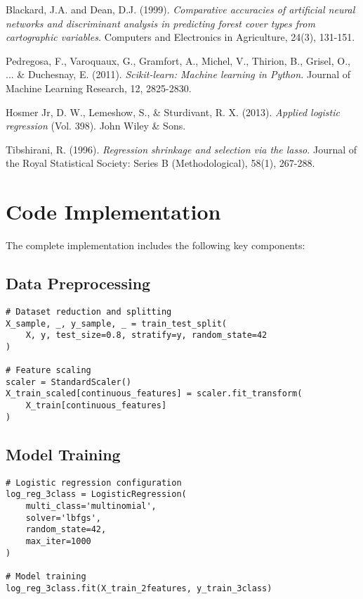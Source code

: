 \documentclass[12pt,a4paper]{article}
\begin{document}

\begin{thebibliography}{9}

Blackard, J.A. and Dean, D.J. (1999). 
\textit{Comparative accuracies of artificial neural networks and discriminant analysis in predicting forest cover types from cartographic variables.} 
Computers and Electronics in Agriculture, 24(3), 131-151.

Pedregosa, F., Varoquaux, G., Gramfort, A., Michel, V., Thirion, B., Grisel, O., ... \& Duchesnay, E. (2011). 
\textit{Scikit-learn: Machine learning in Python.} 
Journal of Machine Learning Research, 12, 2825-2830.

Hosmer Jr, D. W., Lemeshow, S., \& Sturdivant, R. X. (2013). 
\textit{Applied logistic regression} (Vol. 398). 
John Wiley \& Sons.

Tibshirani, R. (1996). 
\textit{Regression shrinkage and selection via the lasso.} 
Journal of the Royal Statistical Society: Series B (Methodological), 58(1), 267-288.

\end{thebibliography}

\appendix

\section{Code Implementation}
\label{app:code}

The complete implementation includes the following key components:

\subsection{Data Preprocessing}
\begin{lstlisting}
# Dataset reduction and splitting
X_sample, _, y_sample, _ = train_test_split(
    X, y, test_size=0.8, stratify=y, random_state=42
)

# Feature scaling
scaler = StandardScaler()
X_train_scaled[continuous_features] = scaler.fit_transform(
    X_train[continuous_features]
)
\end{lstlisting}

\subsection{Model Training}
\begin{lstlisting}
# Logistic regression configuration
log_reg_3class = LogisticRegression(
    multi_class='multinomial',
    solver='lbfgs',
    random_state=42,
    max_iter=1000
)

# Model training
log_reg_3class.fit(X_train_2features, y_train_3class)
\end{lstlisting}
\end{document}
